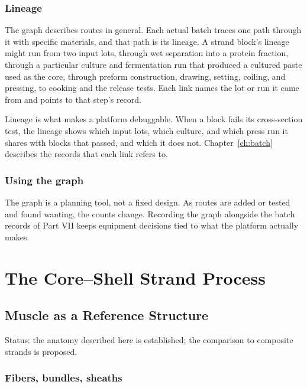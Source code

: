 \documentclass[11pt,openany]{book}
\theoremstyle{definition}
\begin{document}
\section{Lineage}

The graph describes routes in general. Each actual batch traces one path through it with specific materials, and that path is its lineage. A strand block's lineage might run from two input lots, through wet separation into a protein fraction, through a particular culture and fermentation run that produced a cultured paste used as the core, through preform construction, drawing, setting, coiling, and pressing, to cooking and the release tests. Each link names the lot or run it came from and points to that step's record.

Lineage is what makes a platform debuggable. When a block fails its cross-section test, the lineage shows which input lots, which culture, and which press run it shares with blocks that passed, and which it does not. Chapter~\ref{ch:batch} describes the records that each link refers to.

\section{Using the graph}

The graph is a planning tool, not a fixed design. As routes are added or tested and found wanting, the counts change. Recording the graph alongside the batch records of Part VII keeps equipment decisions tied to what the platform actually makes.

\part{The Core--Shell Strand Process}

\chapter{Muscle as a Reference Structure}\label{ch:muscle}

Status: the anatomy described here is established; the comparison to composite strands is proposed.

\section{Fibers, bundles, sheaths}
\end{document}
